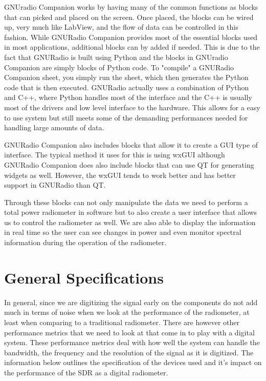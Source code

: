 GNUradio Companion works by having many of the common functions as blocks that can picked and placed on the screen.  Once placed, the blocks can be wired up, very much like LabView, and the flow of data can be controlled in this fashion.  While GNURadio Companion provides most of the essential blocks used in most applications, additional blocks can by added if needed.  This is due to the fact that GNURadio is built using Python and the blocks in GNUradio Companion are simply blocks of Python code.  To "compile" a GNURadio Companion sheet, you simply run the sheet, which then generates the Python code that is then executed.  GNURadio actually uses a combination of Python and C++, where Python handles most of the interface and the C++ is usually most of the drivers and low level interface to the hardware.  This allows for a easy to use system but still meets some of the demanding performances needed for handling large amounts of data.  

GNURadio Companion also includes blocks that allow it to create a GUI type of interface.  The typical method it uses for this is using wxGUI although GNURadio Companion does also include blocks that can use QT for generating widgets as well.  However, the wxGUI tends to work better and has better support in GNURadio than QT.  

Through these blocks can not only manipulate the data we need to perform a total power radiometer in software but to also create a user interface that allows us to control the radiometer as well.  We are also able to display the information in real time so the user can see changes in power and even monitor spectral information during the operation of the radiometer. 

\section{General Specifications}
In general, since we are digitizing the signal early on the components do not add much in terms of noise when we look at the performance of the radiometer, at least when comparing to a traditional radiometer.  There are however other performance metrics that we need to look at that come in to play with a digital system.  These performance metrics deal with how well the system can handle the bandwidth, the frequency and the resolution of the signal as it is digitized.  The information below outlines the specification of the devices used and it's impact on the performance of the SDR as a digital radiometer.  

